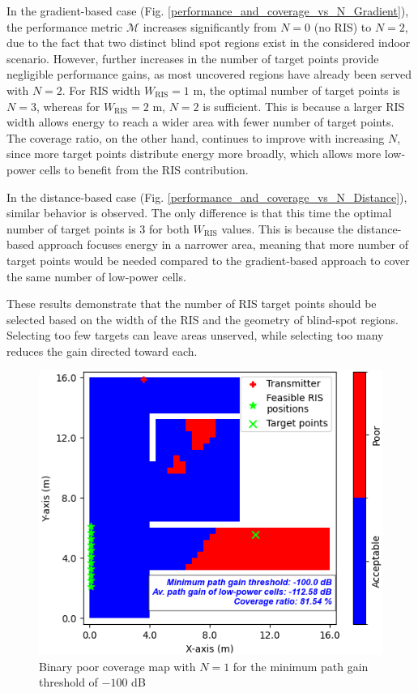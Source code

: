 \documentclass{IEEEoj}
\begin{document}
In the gradient-based case (Fig. \ref{performance_and_coverage_vs_N_Gradient}), the performance metric $\mathcal{M}$ increases significantly from $N = 0$ (no RIS) to $N = 2$, due to the fact that two distinct blind spot regions exist in the considered indoor scenario. However, further increases in the number of target points provide negligible performance gains, as most uncovered regions have already been served with $N = 2$. For RIS width $W_{\text{RIS}} = 1$ m, the optimal number of target points is $N = 3$, whereas for $W_{\text{RIS}} = 2$ m, $N = 2$ is sufficient. This is because a larger RIS width allows energy to reach a wider area with fewer number of target points. The coverage ratio, on the other hand, continues to improve with increasing $N$, since more target points distribute energy more broadly, which allows more low-power cells to benefit from the RIS contribution.

In the distance-based case (Fig. \ref{performance_and_coverage_vs_N_Distance}), similar behavior is observed. The only difference is that this time the optimal number of target points is $3$ for both $W_{\text{RIS}}$ values. This is because the distance-based approach focuses energy in a narrower area, meaning that more number of target points would be needed compared to the gradient-based approach to cover the same number of low-power cells.

These results demonstrate that the number of RIS target points should be selected based on the width of the RIS and the geometry of blind-spot regions. Selecting too few targets can leave areas unserved, while selecting too many reduces the gain directed toward each.

\begin{figure}
	\centering \includegraphics[width=.7\linewidth]{Sim_Results/Binary_Cov_Map_N_1_-100dB.png}
	\caption{Binary poor coverage map with $N = 1$ for the minimum path gain threshold of $-100$ dB}
	\label{binary_poor_cov_map_N_1}
\end{figure}
\end{document}
